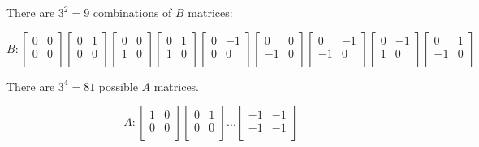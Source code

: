\documentclass[
12.5pt, 					%
a4paper, 				%
oneside,					%
headinclude,footinclude, %
BCOR5mm, 				%
abstract=on
]{scrreprt}
\numberwithin{equation}{chapter}
\begin{document}
There are $3^2=9$ combinations of $B$ matrices:

$$
B :
 \begin{bmatrix}
  0 & 0 \\
  0 & 0 \\
 \end{bmatrix}
 \begin{bmatrix}
  0 & 1 \\
  0 & 0 \\
 \end{bmatrix}
  \begin{bmatrix}
  0 & 0 \\
  1& 0 \\
 \end{bmatrix}
   \begin{bmatrix}
  0 & 1 \\
  1& 0 \\
 \end{bmatrix}
  \begin{bmatrix}
  0 & -1 \\
  0 & 0 \\
 \end{bmatrix}
  \begin{bmatrix}
  0 & 0 \\
  -1 & 0 \\
 \end{bmatrix}
 \begin{bmatrix}
  0 & -1 \\
  -1 & 0 \\
 \end{bmatrix}
  \begin{bmatrix}
  0 & -1 \\
  1 & 0 \\
 \end{bmatrix}
   \begin{bmatrix}
  0 & 1 \\
  -1 & 0 \\
 \end{bmatrix}
$$

There are $3^4=81$ possible $A$ matrices.

$$
A :
 \begin{bmatrix}
  1 & 0 \\
  0 & 0 \\
 \end{bmatrix}
 \begin{bmatrix}
  0 & 1 \\
  0 & 0 \\
 \end{bmatrix}
 ...
 \begin{bmatrix}
  -1 & -1 \\
  -1 & -1 \\
 \end{bmatrix}
$$
\end{document}

